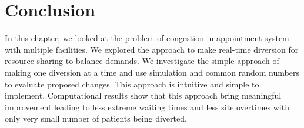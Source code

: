 \section{Conclusion}

In this chapter, we looked at the problem of congestion in appointment
system with multiple facilities. We explored the approach to make
real-time diversion for resource sharing to balance demands.
We investigate the simple approach of making one diversion at
a time and use simulation and common random numbers to evaluate
proposed changes. This approach is intuitive and simple to
implement. Computational results show that this approach bring
meaningful improvement leading to less extreme waiting times and less
site overtimes with only very small number of patients being diverted.
